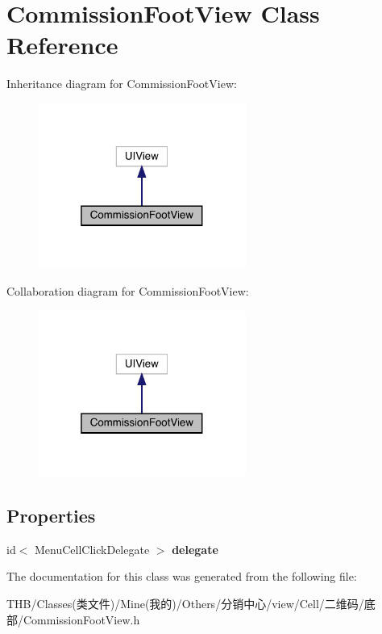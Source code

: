 \hypertarget{interface_commission_foot_view}{}\section{Commission\+Foot\+View Class Reference}
\label{interface_commission_foot_view}


Inheritance diagram for Commission\+Foot\+View\+:\nopagebreak
\begin{figure}[H]
\begin{center}
\leavevmode
\includegraphics[width=193pt]{interface_commission_foot_view__inherit__graph}
\end{center}
\end{figure}


Collaboration diagram for Commission\+Foot\+View\+:\nopagebreak
\begin{figure}[H]
\begin{center}
\leavevmode
\includegraphics[width=193pt]{interface_commission_foot_view__coll__graph}
\end{center}
\end{figure}
\subsection*{Properties}
\begin{DoxyCompactItemize}
\item 
\mbox{\label{interface_commission_foot_view_a98c2f18dd27834fa302b24b06625cfdd}} 
id$<$ Menu\+Cell\+Click\+Delegate $>$ {\bfseries delegate}
\end{DoxyCompactItemize}


The documentation for this class was generated from the following file\+:\begin{DoxyCompactItemize}
\item 
T\+H\+B/\+Classes(类文件)/\+Mine(我的)/\+Others/分销中心/view/\+Cell/二维码/底部/Commission\+Foot\+View.\+h\end{DoxyCompactItemize}
